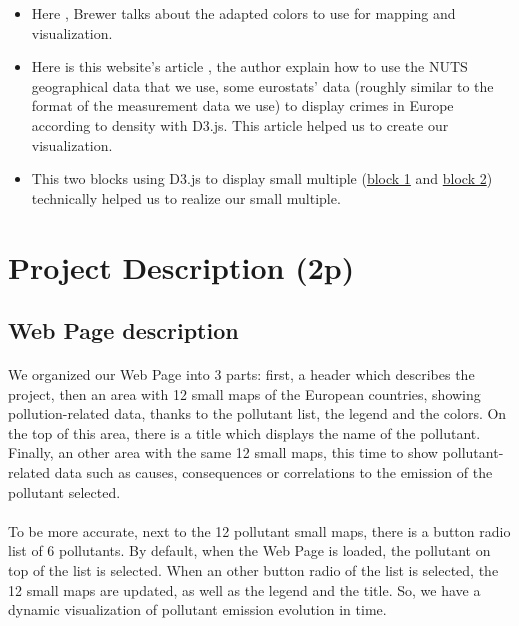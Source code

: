 \documentclass[preprint,journal]{vgtc}       %
\begin{document}
\begin{itemize}
\item Here \cite{Brewer:1994:CUG} , Brewer talks about the adapted colors to use for mapping and visualization.

\item Here is this website's article \cite{Roger:2013:EWD}, the author explain how to use the NUTS geographical data that we use, some eurostats' data (roughly similar to the format of the measurement data we use) to display crimes in Europe according to density with D3.js. This article helped us to create our visualization.

\item This two blocks using D3.js to display small multiple (\href{http://bl.ocks.org/tomgp/9386620}{block 1} and \href{https://bl.ocks.org/armollica/6314f45890bcaaa45c808b5d2b0c602f}{block 2}) technically helped us to realize our small multiple.

\end{itemize}

\newpage



\section{Project Description (2p)}
	\subsection{Web Page description}
	\paragraph{}
We organized our Web Page into 3 parts:  first, a header which describes the project, then an area with 12 small maps of the European countries, showing pollution-related data, thanks to the pollutant list, the legend and the colors. On the top of this area, there is a title which displays the name of the pollutant. Finally, an other area with the same 12 small maps, this time to show pollutant-related data such as causes, consequences or correlations to the emission of the pollutant selected.
\paragraph{}
To be more accurate, next to the 12 pollutant small maps, there is a button radio list of 6 pollutants. By default, when the Web Page is loaded, the pollutant on top of the list is selected. When an other button radio of the list is selected, the 12 small maps are updated, as well as the legend and the title. So, we have a dynamic visualization of pollutant emission evolution in time.
\end{document}

